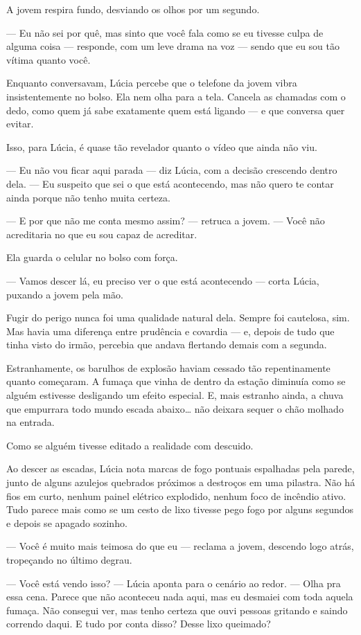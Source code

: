 A jovem respira fundo, desviando os olhos por um segundo.

— Eu não sei por quê, mas sinto que você fala como se eu tivesse culpa de alguma coisa — responde, com um leve drama na voz — sendo que eu sou tão vítima quanto você.

Enquanto conversavam, Lúcia percebe que o telefone da jovem vibra insistentemente no bolso.
Ela nem olha para a tela. Cancela as chamadas com o dedo, como quem já sabe exatamente quem está ligando — e que conversa quer evitar.

Isso, para Lúcia, é quase tão revelador quanto o vídeo que ainda não viu.

— Eu não vou ficar aqui parada — diz Lúcia, com a decisão crescendo dentro dela. — Eu suspeito que sei o que está acontecendo, mas não quero te contar ainda porque não tenho muita certeza.

— E por que não me conta mesmo assim? — retruca a jovem. — Você não acreditaria no que eu sou capaz de acreditar.

Ela guarda o celular no bolso com força.

— Vamos descer lá, eu preciso ver o que está acontecendo — corta Lúcia, puxando a jovem pela mão.

Fugir do perigo nunca foi uma qualidade natural dela.  
Sempre foi cautelosa, sim.  
Mas havia uma diferença entre prudência e covardia — e, depois de tudo que tinha visto do irmão, percebia que andava flertando demais com a segunda.

Estranhamente, os barulhos de explosão haviam cessado tão repentinamente quanto começaram.  
A fumaça que vinha de dentro da estação diminuía como se alguém estivesse desligando um efeito especial.  
E, mais estranho ainda, a chuva que empurrara todo mundo escada abaixo… não deixara sequer o chão molhado na entrada.

Como se alguém tivesse editado a realidade com descuido.

Ao descer as escadas, Lúcia nota marcas de fogo pontuais espalhadas pela parede, junto de alguns azulejos quebrados próximos a destroços em uma pilastra.  
Não há fios em curto, nenhum painel elétrico explodido, nenhum foco de incêndio ativo.  
Tudo parece mais como se um cesto de lixo tivesse pego fogo por alguns segundos e depois se apagado sozinho.

— Você é muito mais teimosa do que eu — reclama a jovem, descendo logo atrás, tropeçando no último degrau.

— Você está vendo isso? — Lúcia aponta para o cenário ao redor. — Olha pra essa cena. Parece que não aconteceu nada aqui, mas eu desmaiei com toda aquela fumaça. Não consegui ver, mas tenho certeza que ouvi pessoas gritando e saindo correndo daqui.  
E tudo por conta disso?  
Desse lixo queimado?

